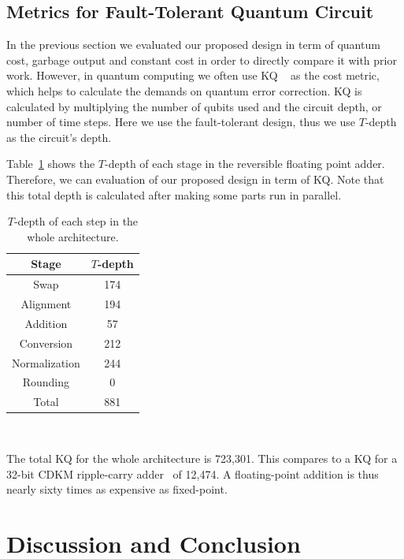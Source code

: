 \documentclass[%
reprint,
 amsmath,amssymb,
 aps,
]{revtex4-1}
\begin{document}
\subsection{Metrics for Fault-Tolerant Quantum Circuit}

In the previous section we evaluated our proposed design in term of quantum cost, garbage output and constant cost in order to directly compare it with prior work. However, in quantum computing we often use KQ ~\cite{fault-tolerant} as the cost metric, which helps to calculate the demands on quantum error correction. KQ is calculated by multiplying the number of qubits used and the circuit depth, or number of time steps. Here we use the fault-tolerant design, thus we use $T$-depth as the circuit's depth. 

\par Table~\ref{tab:T-depth} shows the $T$-depth of each stage in the reversible floating point adder. Therefore, we can evaluation of our proposed design in term of KQ. Note that this total depth is calculated after making some parts run in parallel. 


\begin{table}
\centering
\begin{tabular}{|c|c|}
\hline
\textbf{Stage} & \textbf{$T$-depth} \\
\hline
 Swap & 174  \\ \hline
 Alignment & 194  \\ \hline
 Addition &  57 \\ \hline
 Conversion & 212  \\ \hline
 Normalization & 244  \\ \hline
 Rounding & 0 \\ \hline 
 Total &  881 \\ \hline 
\end{tabular}
\\
\caption{$T$-depth of each step in the whole architecture.}
\label{tab:T-depth}
\end{table} 

The total KQ for the whole architecture is 723,301. This compares to a KQ for a 32-bit CDKM ripple-carry adder~\cite{cuccaro04:new-quant-ripple} of 12,474. A floating-point addition is thus nearly sixty times as expensive as fixed-point.
    
\section{Discussion and Conclusion}
\end{document}
